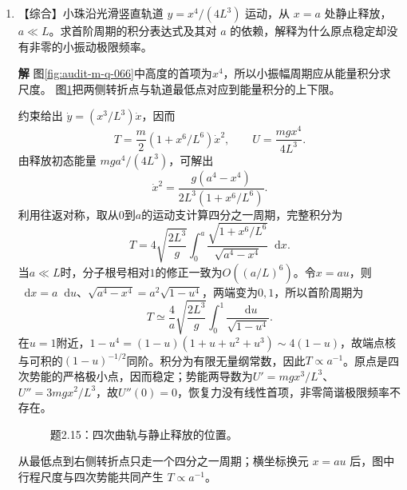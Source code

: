 \documentclass[11pt,openany,fontset=fandol]{ctexbook}
\theoremstyle{plain}\newtheorem{theorem}{定理}[chapter]\newtheorem{proposition}[theorem]{命题}
\theoremstyle{definition}\newtheorem{definition}{定义}[chapter]\newtheorem{example}{例}[chapter]
\theoremstyle{remark}\newtheorem*{remark}{说明}
\newcommand{\SolutionStart}{\par\nobreak\medskip\nobreak\noindent\textbf{解}\quad\ignorespaces}
\newenvironment{solution}{\SolutionStart}{\par\medskip}
\newcommand{\dd}{\mathop{}\!\mathrm d}\newcommand{\ii}{\mathrm i}\newcommand{\ee}{\mathrm e}
\begin{document}
\begin{enumerate}[label=2.\arabic*]
\begin{solution}
在 $P$，$\nabla\Phi=(0,-6)$、$\nabla\Psi=(6,0)$，两条法向互相垂直；电场向上，正好沿 $\Psi=2$ 曲线的切线。
\end{solution}

\item \begin{minipage}[t]{\linewidth}
【综合】小珠沿光滑竖直轨道 $y=x^4/(4L^3)$ 运动，从 $x=a$ 处静止释放，$a\ll L$。求首阶周期的积分表达式及其对 $a$ 的依赖，解释为什么原点稳定却没有非零的小振动极限频率。

\end{minipage}

\begin{solution}
图\ref{fig:audit-m-q-066}中高度的首项为$x^4$，所以小振幅周期应从能量积分求尺度。
图\ref{fig:ex-2-15}把两侧转折点与轨道最低点对应到能量积分的上下限。

约束给出 $\dot y=(x^3/L^3)\dot x$，因而
\[
T=\frac m2(1+x^6/L^6)\dot x^2,\qquad U=\frac{mgx^4}{4L^3}.
\]
由释放初态能量 $mga^4/(4L^3)$，可解出
\[
\dot x^2=\frac{g(a^4-x^4)}{2L^3(1+x^6/L^6)}.
\]
利用往返对称，取从$0$到$a$的运动支计算四分之一周期，完整积分为
\[T=4\sqrt{\frac{2L^3}{g}}\int_0^a
\frac{\sqrt{1+x^6/L^6}}{\sqrt{a^4-x^4}}\dd x.\]
当$a\ll L$时，分子根号相对$1$的修正一致为$O((a/L)^6)$。令$x=au$，则$\dd x=a\dd u$、$\sqrt{a^4-x^4}=a^2\sqrt{1-u^4}$，两端变为$0,1$，所以首阶周期为
\[
T\simeq\frac4a\sqrt{\frac{2L^3}{g}}\int_0^1\frac{\dd u}{\sqrt{1-u^4}}.
\]
在$u=1$附近，$1-u^4=(1-u)(1+u+u^2+u^3)\sim4(1-u)$，故端点核与可积的$(1-u)^{-1/2}$同阶。积分为有限无量纲常数，因此$T\propto a^{-1}$。原点是四次势能的严格极小点，因而稳定；势能两导数为$U'=mgx^3/L^3$、$U''=3mgx^2/L^3$，故$U''(0)=0$，恢复力没有线性首项，非零简谐极限频率不存在。

\begin{figure}[H]\centering
{}
\caption{题2.15：四次曲轨与静止释放的位置。}\label{fig:ex-2-15}
\end{figure}

从最低点到右侧转折点只走一个四分之一周期；横坐标换元 $x=au$ 后，图中行程尺度与四次势能共同产生 $T\propto a^{-1}$。
\end{solution}


\end{enumerate}
\end{document}
